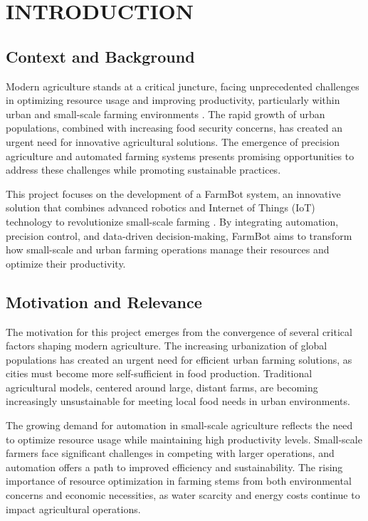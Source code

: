 \chapter{INTRODUCTION}

\section{Context and Background}
Modern agriculture stands at a critical juncture, facing unprecedented challenges in optimizing resource usage and improving productivity, particularly within urban and small-scale farming environments \cite{agtech2023}. The rapid growth of urban populations, combined with increasing food security concerns, has created an urgent need for innovative agricultural solutions. The emergence of precision agriculture and automated farming systems presents promising opportunities to address these challenges while promoting sustainable practices.

This project focuses on the development of a FarmBot system, an innovative solution that combines advanced robotics and Internet of Things (IoT) technology to revolutionize small-scale farming \cite{farmbot2020}. By integrating automation, precision control, and data-driven decision-making, FarmBot aims to transform how small-scale and urban farming operations manage their resources and optimize their productivity.

\section{Motivation and Relevance}
The motivation for this project emerges from the convergence of several critical factors shaping modern agriculture. The increasing urbanization of global populations has created an urgent need for efficient urban farming solutions, as cities must become more self-sufficient in food production. Traditional agricultural models, centered around large, distant farms, are becoming increasingly unsustainable for meeting local food needs in urban environments.

The growing demand for automation in small-scale agriculture reflects the need to optimize resource usage while maintaining high productivity levels. Small-scale farmers face significant challenges in competing with larger operations, and automation offers a path to improved efficiency and sustainability. The rising importance of resource optimization in farming stems from both environmental concerns and economic necessities, as water scarcity and energy costs continue to impact agricultural operations.

